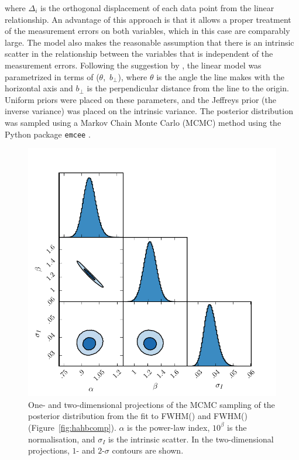 \noindent where $\Delta_i$ is the orthogonal displacement of each data point from the linear relationship.
An advantage of this approach is that it allows a proper treatment of the measurement errors on both variables, which in this case are comparably large.
The model also makes the reasonable assumption that there is an intrinsic scatter in the relationship between the variables that is independent of the measurement errors.
Following the suggestion by \citet{hogg10}, the linear model was parametrized in terms of ($\theta$,~$b_\bot$), where $\theta$ is the angle the line makes with the horizontal axis and $b_\bot$ is the perpendicular distance from the line to the origin.
Uniform priors were placed on these parameters, and the Jeffreys prior (the inverse variance) was placed on the intrinsic variance.
The posterior distribution was sampled using a Markov Chain Monte Carlo (MCMC) method using the Python package \texttt{emcee} \citep{foreman13}.

\begin{figure}[t!]
    \centering
    \includegraphics[width=0.8\columnwidth]{figures/chapter03/ha_hb_mcmc_parameters.pdf}
    \caption[{Projections of the MCMC sampling of the posterior distribution from the fit to FWHM(\hans) and FWHM(\hbns).}]{One- and two-dimensional projections of the MCMC sampling of the posterior distribution from the fit to FWHM(\hans) and FWHM(\hbns) (Figure~\ref{fig:hahbcomp}). $\alpha$ is the power-law index, $10^\beta$ is the normalisation, and $\sigma_I$ is the intrinsic scatter. In the two-dimensional projections, $1$- and $2$-$\sigma$ contours are shown.}
    \label{fig:ha_hb_mcmc_samples}
\end{figure}

